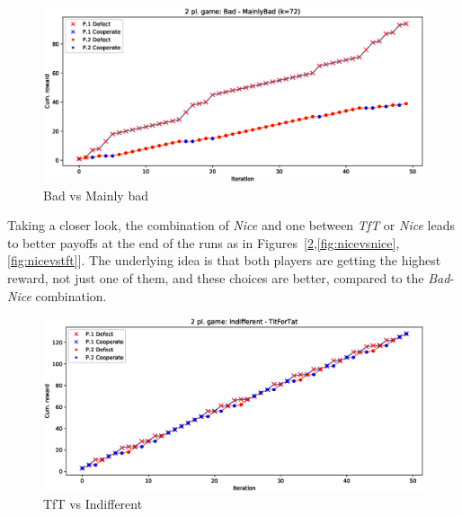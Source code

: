 \documentclass[journal,10pt,twoside]{IEEEtran}
\begin{document}
\begin{figure}[!ht]
    \centering
    \includegraphics[width=1\columnwidth]{../img/ipd2p/ipd2p-rewards-Bad-MainlyBad(k=72)}
    \caption{Bad vs Mainly bad}
    \label{fig:badvsmainlybad}
\end{figure}

Taking a closer look, the combination of \textit{Nice} and one between \textit{TfT} or \textit{Nice} leads to better payoffs at the end of the runs as in Figures~[\ref{fig:tftvsindiff},\ref{fig:nicevsnice},\ref{fig:nicevstft}]. The underlying idea is that both players are getting the highest reward, not just one of them, and these choices are better, compared to the \textit{Bad}-\textit{Nice} combination.

\begin{figure}[!ht]
    \centering
    \includegraphics[width=1\columnwidth]{../img/ipd2p/ipd2p-rewards-Indifferent-TitForTat}
    \caption{TfT vs Indifferent}
    \label{fig:tftvsindiff}
\end{figure}
\end{document}

